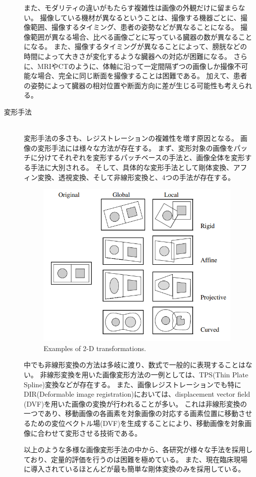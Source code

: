 \begin{description}
            また、モダリティの違いがもたらす複雑性は画像の外観だけに留まらない。
            撮像している機材が異なるということは、撮像する機器ごとに、撮像範囲、撮像するタイミング、患者の姿勢などが異なることになる。
            撮像範囲が異なる場合、比べる画像ごとに写っている臓器の数が異なることになる。
            また、撮像するタイミングが異なることによって、膀胱などの時間によって大きさが変化するような臓器への対応が困難になる。
            さらに、MRIやCTのように、体軸に沿って一定間隔ずつの画像しか撮像不可能な場合、完全に同じ断面を撮像することは困難である。
            加えて、患者の姿勢によって臓器の相対位置や断面方向に差が生じる可能性も考えられる。

        \item[変形手法]\mbox{}\\
            変形手法の多さも、レジストレーションの複雑性を増す原因となる。
            画像の変形手法には様々な方法が存在する。
            まず、変形対象の画像をパッチに分けてそれぞれを変形するパッチベースの手法と、画像全体を変形する手法に大別される。
            そして、具体的な変形手法として剛体変換、アフィン変換、透視変換、そして非線形変換と、4つの手法が存在する。
            \begin{figure}[ht]
              \centering
              \includegraphics[width=10cm]{1_intro/img/2Dtransformations.png}
              \caption{Examples of 2-D transformations\cite{maintz1998survey}.}
            \end{figure}
    
            中でも非線形変換の方法は多岐に渡り、数式で一般的に表現することはない。
            非線形変換を用いた画像変形方法の一例としては、TPS(Thin Plate Spline)変換などが存在する。
            また、画像レジストレーションでも特にDIR(Deformable image registration)においては、displacement vector field (DVF)を用いた画像の変換が行われることが多い。
            これは非線形変換の一つであり、移動画像の各画素を対象画像の対応する画素位置に移動させるための変位ベクトル場(DVF)を生成することにより、移動画像を対象画像に合わせて変形させる技術である。
            
            以上のような多様な画像変形手法の中から、各研究が様々な手法を採用しており、定量的評価を行うのは困難を極めている。
            また、現在臨床現場に導入されているほとんどが最も簡単な剛体変換のみを採用している\cite{viergever2016survey}。
    \end{description}


